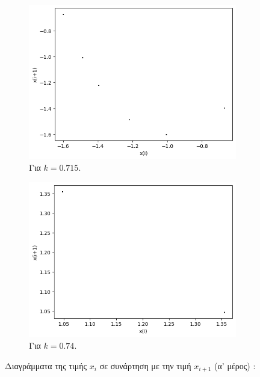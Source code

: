 \begin{figure}[h!]
\begin{subfigure}[b]{0.4\textwidth}
		\includegraphics[width=\textwidth]{LateX images/graphs q16/g15}
		\caption{Για $k=0.715$.}
		\label{f:k86}
	\end{subfigure}
	\hfill
	\begin{subfigure}[b]{0.4\textwidth}
		\centering
		\includegraphics[width=\textwidth]{LateX images/graphs q16/g16}
		\caption{Για $k=0.74$.}
		\label{f:k87}
	\end{subfigure}
	\hfill
	
	\caption{Διαγράμματα της τιμής \(x_i\) σε συνάρτηση με την τιμή \(x_{i+1}\) (α' μέρος) :}
	\label{f:k240}
\end{figure}
